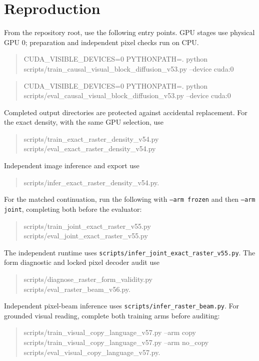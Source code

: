 \documentclass[10pt,a4paper]{article}
\providecommand{\DIFaddend}{} %
\begin{document}
\clearpage
\DIFaddend \section*{Reproduction}
From the repository root, use the following entry points. GPU stages use
physical GPU 0; preparation and independent pixel checks run on CPU.
\begin{quote}\small\ttfamily
CUDA\_VISIBLE\_DEVICES=0 PYTHONPATH=. python\\
scripts/train\_causal\_visual\_block\_diffusion\_v53.py --device cuda:0
\end{quote}
\begin{quote}\small\ttfamily
CUDA\_VISIBLE\_DEVICES=0 PYTHONPATH=. python\\
scripts/eval\_causal\_visual\_block\_diffusion\_v53.py --device cuda:0
\end{quote}
Completed output directories are protected against accidental replacement.
For the exact density, with the same GPU selection, use
\begin{quote}\small\ttfamily
scripts/train\_exact\_raster\_density\_v54.py\\
scripts/eval\_exact\_raster\_density\_v54.py
\end{quote}
Independent image inference and export use
\begin{quote}\small\ttfamily
scripts/infer\_exact\_raster\_density\_v54.py.
\end{quote}
For the matched continuation, run the following with \texttt{--arm frozen}
and then \texttt{--arm joint}, completing both before the evaluator:
\begin{quote}\small\ttfamily
scripts/train\_joint\_exact\_raster\_v55.py\\
scripts/eval\_joint\_exact\_raster\_v55.py
\end{quote}
The independent runtime uses
\texttt{scripts/infer\_joint\_exact\_raster\_v55.py}.
The form diagnostic and locked pixel decoder audit use
\begin{quote}\small\ttfamily
scripts/diagnose\_raster\_form\_validity.py\\
scripts/eval\_raster\_beam\_v56.py.
\end{quote}
Independent pixel-beam inference uses
\texttt{scripts/infer\_raster\_beam.py}.
For grounded visual reading, complete both training arms before auditing:
\begin{quote}\small\ttfamily
scripts/train\_visual\_copy\_language\_v57.py --arm copy\\
scripts/train\_visual\_copy\_language\_v57.py --arm no\_copy\\
scripts/eval\_visual\_copy\_language\_v57.py.
\end{quote}
\end{document}
